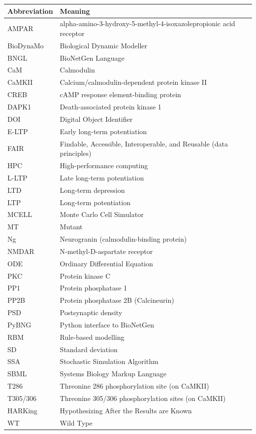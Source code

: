 \documentclass[
  11pt,
  letterpaper,
]{scrreprt}
\begin{document}
\begin{tabularx}{\textwidth}{lX}
\hline
Abbreviation & Meaning \\
\hline
AMPAR & alpha-amino-3-hydroxy-5-methyl-4-isoxazolepropionic acid receptor \\
BioDynaMo & Biological Dynamic Modeller \\
BNGL & BioNetGen Language \\
CaM & Calmodulin \\
CaMKII & Calcium/calmodulin-dependent protein kinase II \\
CREB & cAMP response element-binding protein \\
DAPK1 & Death-associated protein kinase 1 \\
DOI & Digital Object Identifier \\
E-LTP & Early long-term potentiation \\
FAIR & Findable, Accessible, Interoperable, and Reusable (data principles) \\
HPC & High-performance computing \\
L-LTP & Late long-term potentiation \\
LTD & Long-term depression \\
LTP & Long-term potentiation \\
MCELL & Monte Carlo Cell Simulator \\
MT & Mutant \\
Ng & Neurogranin (calmodulin-binding protein) \\
NMDAR & N-methyl-D-aspartate receptor \\
ODE & Ordinary Differential Equation \\
PKC & Protein kinase C \\
PP1 & Protein phosphatase 1 \\
PP2B & Protein phosphatase 2B (Calcineurin) \\
PSD & Postsynaptic density \\
PyBNG & Python interface to BioNetGen \\
RBM & Rule-based modelling \\
SD & Standard deviation \\
SSA & Stochastic Simulation Algorithm \\
SBML & Systems Biology Markup Language \\
T286 & Threonine 286 phosphorylation site (on CaMKII) \\
T305/306 & Threonine 305/306 phosphorylation sites (on CaMKII) \\
HARKing & Hypothesizing After the Results are Known \\
WT & Wild Type \\
\hline
\end{tabularx}
\end{document}
